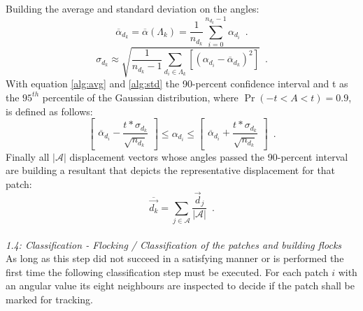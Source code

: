 \documentclass[conference]{IEEEtran}
\begin{document}
Building the average and standard deviation on the angles:
\begin{equation}
\label{alg:avg}
\overline{\alpha}_{d_k} = \overline{ \alpha } \left( \Lambda_k \right)  = \frac{1}{n_{d_k}} \sum_{i=0}^{n_{d_k}-1} \alpha_{d_i} \enspace .
\end{equation}
%
\begin{equation}
\label{alg:std}
\sigma_{d_k} \approx \sqrt{ \frac{1}{n_{d_k} - 1} \sum_{d_i \in \Lambda_k} \left[ \left( \alpha_{d_i} - \overline{ \alpha}_{d_k} \right) ^2\right] } \enspace .
\end{equation}
%
With equation \ref{alg:avg} and \ref{alg:std} the 90-percent confidence interval and t as the $95^{th}$ percentile of the Gaussian distribution, where $\Pr\left(-t<A<t\right)=0.9$, is defined as follows:
%
\begin{equation}
\label{confint}
\begin{bmatrix}  \overline{ \alpha}_{d_i} - \dfrac{t*\sigma_{d_k}}{\sqrt {n_{d_k}} } \end{bmatrix} 
\leq \alpha_{d_i} \leq 
\begin{bmatrix} \overline{ \alpha}_{d_i} + \dfrac{t*\sigma_{d_k}}{\sqrt {n_{d_k}} } \end{bmatrix} \enspace .
\end{equation}
%
Finally all $|\mathcal{A}|$ displacement vectors whose angles passed the 90-percent interval are building a resultant that depicts the representative displacement for that patch:
%
\begin{equation}
\label{representative}
\overline{ \vec{d_k }} =  \sum_{j \in \mathcal{A}}{\frac{\vec{d}_j}{|\mathcal{A}|} } \enspace .
\end{equation}
\\ \newline
%
\textit{1.4: Classification - Flocking / Classification of the patches and building flocks} \\ \newline
As long as this step did not succeed in a satisfying manner or is performed the first time the following classification step must be executed. For each patch $i$ with an angular value its eight neighbours are inspected to decide if the patch shall be marked for tracking. 
\end{document}
